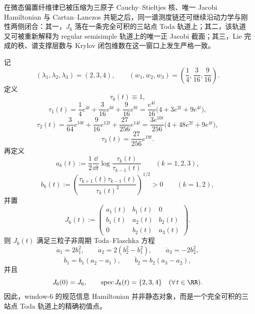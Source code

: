 \noindent
在微态偏置纤维律已被压缩为三原子 Cauchy--Stieltjes 核、唯一 Jacobi Hamiltonian 与 Cartan--Lanczos 共轭之后，同一谱测度链还可继续沿动力学与刚性两侧闭合：其一，\(J_6\) 落在一条完全可积的三站点 Toda 轨道上；其二，该轨道又可被重新解释为 regular semisimple 轨道上的唯一正 Jacobi 截面；其三，Lie 完成的秩、谱支撑层数与 Krylov 闭包维数在这一窗口上发生严格一致。

\begin{theorem}\label{thm:xi-time-part9zd-window6-three-site-toda-molecule}
记
\[
(\lambda_1,\lambda_2,\lambda_3)=(2,3,4),
\qquad
(w_1,w_2,w_3)=\left(\frac14,\frac3{16},\frac9{16}\right).
\]
定义
\[
\tau_0(t)\equiv 1,
\]
\[
\tau_1(t)
=
\frac14e^{4t}+\frac3{16}e^{6t}+\frac9{16}e^{8t}
=
\frac{e^{4t}}{16}\bigl(4+3e^{2t}+9e^{4t}\bigr),
\]
\[
\tau_2(t)
=
\frac3{64}e^{10t}+\frac9{16}e^{12t}+\frac{27}{256}e^{14t}
=
\frac{3e^{10t}}{256}\bigl(4+48e^{2t}+9e^{4t}\bigr),
\]
\[
\tau_3(t)=\frac{27}{256}e^{18t}.
\]
再定义
\[
a_k(t):=\frac12\frac{\dd}{\dd t}\log\frac{\tau_k(t)}{\tau_{k-1}(t)}
\qquad (k=1,2,3),
\]
\[
b_k(t):=\left(\frac{\tau_{k+1}(t)\tau_{k-1}(t)}{\tau_k(t)^2}\right)^{1/2}>0
\qquad (k=1,2),
\]
并置
\[
J_6(t):=
\begin{pmatrix}
a_1(t)&b_1(t)&0\\
b_1(t)&a_2(t)&b_2(t)\\
0&b_2(t)&a_3(t)
\end{pmatrix}.
\]
则 \(J_6(t)\) 满足三粒子非周期 Toda--Flaschka 方程
\[
\dot a_1=2b_1^2,\qquad
\dot a_2=2(b_2^2-b_1^2),\qquad
\dot a_3=-2b_2^2,
\]
\[
\dot b_1=b_1(a_2-a_1),\qquad
\dot b_2=b_2(a_3-a_2),
\]
并且
\[
J_6(0)=J_6,
\qquad
\operatorname{spec}J_6(t)=\{2,3,4\}
\quad (\forall\,t\in\RR).
\]
因此，window-\(6\) 的规范信息 Hamiltonian 并非静态对象，而是一个完全可积的三站点 Toda 轨道上的精确初值点。
\end{theorem}
